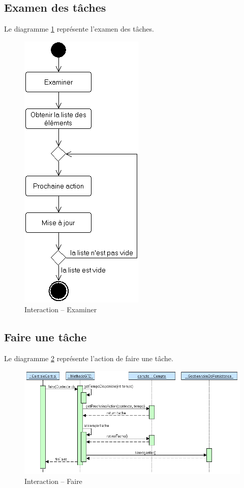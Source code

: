 \subsection{Examen des tâches}

Le diagramme \ref{examinerSequence} représente l'examen des tâches.

\begin{figure}[!htbp]
\centering
\includegraphics[scale=0.5]{images/L3/diagrammeActivite/examiner.png}
\caption{Interaction \--- Examiner}
\label{examinerSequence}
\end{figure}

\subsection{Faire une tâche}

Le diagramme \ref{doSequence} représente l'action de faire une tâche.

\begin{figure}[!htbp]
\centering
\includegraphics[width=12cm]{images/L3/diagrammeSequence/faire.png}
\caption{Interaction \--- Faire}
\label{doSequence}
\end{figure}

